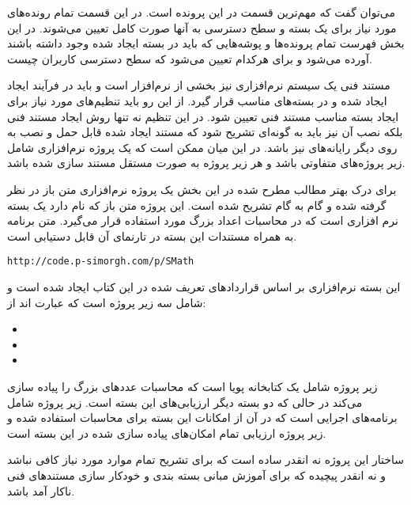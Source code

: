 می‌توان گفت که  مهم‌ترین قسمت در این پرونده است. در این قسمت تمام
رونده‌های مورد نیاز برای یک بسته و سطح دسترسی به آنها صورت کامل 
تعیین می‌شوند. در این بخش فهرست تمام پرونده‌ها و پوشه‌هایی که باید در بسته ایجاد
شده وجود داشته باشند آورده می‌شود و برای هرکدام تعیین می‌شود که سطح دسترسی
کاربران چیست.

مستند فنی یک سیستم نرم‌افزاری نیز بخشی از نرم‌افزار است و باید در فرآیند ایجاد
ایجاد شده و در بسته‌های مناسب قرار گیرد. از این رو باید تنظیم‌های مورد نیاز برای
ایجاد بسته مناسب مستند فنی تعیین شود. در این تنظیم نه تنها روش ایجاد مستند فنی
بلکه نصب آن نیز باید به گونه‌ای تشریح شود که مستند ایجاد شده قابل حمل و نصب به
روی دیگر رایانه‌های نیز باشد. در این میان ممکن است که یک پروژه نرم‌افزاری شامل
زیر پروژه‌های متفاوتی باشد و هر زیر پروژه به صورت مستقل مستند سازی شده باشد.

برای درک بهتر مطالب مطرح شده در این بخش یک پروژه نرم‌افزاری متن باز در نظر
گرفته شده و گام به گام تشریح شده است. این پروژه متن باز که  نام دارد
یک بسته نرم افزاری است که در محاسبات اعداد بزرگ مورد استفاده قرار
می‌گیرد\cite{smath}. متن برنامه به همراه مستندات این بسته در تارنمای آن قابل
دستیابی است.

\begin{latin}
\lstset{language=TeX}  
\begin{lstlisting}[frame=single] 
http://code.p-simorgh.com/p/SMath
\end{lstlisting}
\end{latin}

این بسته نرم‌افزاری بر اساس قراردادهای تعریف شده در این کتاب ایجاد شده است و
شامل سه زیر پروژه است که عبارت اند از:

\begin{itemize}
  \item {}
  \item {}
  \item {}
\end{itemize}

زیر پروژه  شامل یک کتابخانه پویا است که
محاسبات عددهای بزرگ را پیاده سازی می‌کند در حالی که دو بسته دیگر ارزیابی‌های این
بسته است. زیر پروژه  شامل برنامه‌های اجرایی است که در آن از
امکانات این بسته برای محاسبات استفاده شده و زیر پروژه 
ارزیابی تمام امکان‌های پیاده سازی شده در این بسته است.

ساختار این پروژه نه انقدر ساده است که برای تشریح تمام موارد مورد نیاز کافی نباشد
و نه انقدر پیچیده که برای آموزش مبانی بسته بندی و خودکار سازی مستند‌های فنی
ناکار آمد باشد.

